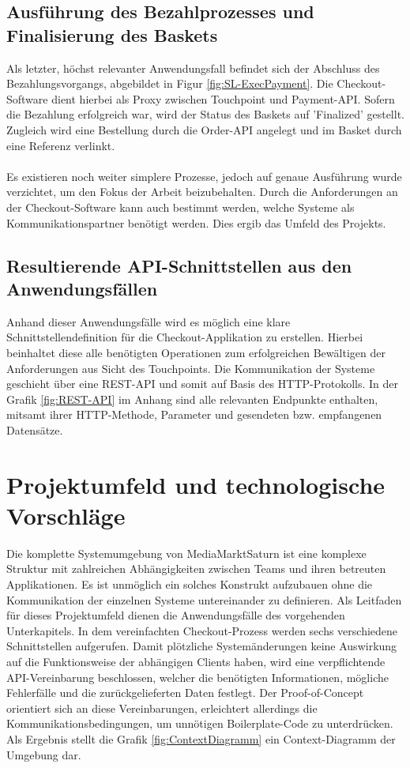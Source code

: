\subsection{Ausführung des Bezahlprozesses und Finalisierung des Baskets}

Als letzter, höchst relevanter Anwendungsfall befindet sich der Abschluss des Bezahlungsvorgangs, abgebildet in Figur \ref{fig:SL-ExecPayment}. Die Checkout-Software dient hierbei als Proxy zwischen Touchpoint und Payment-API. Sofern die Bezahlung erfolgreich war, wird der Status des Baskets auf 'Finalized' gestellt. Zugleich wird eine Bestellung durch die Order-API angelegt und im Basket durch eine Referenz verlinkt. \\\\

Es existieren noch weiter simplere Prozesse, jedoch auf genaue Ausführung wurde verzichtet, um den Fokus der Arbeit beizubehalten. Durch die Anforderungen an der Checkout-Software kann auch bestimmt werden, welche Systeme als Kommunikationspartner benötigt werden. Dies ergib das Umfeld des Projekts. 

\subsection{Resultierende API-Schnittstellen aus den Anwendungsfällen}

Anhand dieser Anwendungsfälle wird es möglich eine klare Schnittstellendefinition für die Checkout-Applikation zu erstellen. Hierbei beinhaltet diese alle benötigten Operationen zum erfolgreichen Bewältigen der Anforderungen aus Sicht des Touchpoints. Die Kommunikation der Systeme geschieht über eine \acrshort{REST}-API und somit auf Basis des \acrshort{HTTP}-Protokolls. In der Grafik \ref{fig:REST-API} im Anhang sind alle relevanten Endpunkte enthalten, mitsamt ihrer HTTP-Methode, Parameter und gesendeten bzw. empfangenen Datensätze.

\section{Projektumfeld und technologische Vorschläge}

Die komplette Systemumgebung von MediaMarktSaturn ist eine komplexe Struktur mit zahlreichen Abhängigkeiten zwischen Teams und ihren betreuten Applikationen. Es ist unmöglich ein solches Konstrukt aufzubauen ohne die Kommunikation der einzelnen Systeme untereinander zu definieren. Als Leitfaden für dieses Projektumfeld dienen die Anwendungsfälle des vorgehenden Unterkapitels. In dem vereinfachten Checkout-Prozess werden sechs verschiedene Schnittstellen aufgerufen. Damit plötzliche Systemänderungen keine Auswirkung auf die Funktionsweise der abhängigen Clients haben, wird eine verpflichtende API-Vereinbarung beschlossen, welcher die benötigten Informationen, mögliche Fehlerfälle und die zurückgelieferten Daten festlegt. Der Proof-of-Concept orientiert sich an diese Vereinbarungen, erleichtert allerdings die Kommunikationsbedingungen, um unnötigen \Gls{Boilerplate}-Code zu unterdrücken. Als Ergebnis stellt die Grafik \ref{fig:ContextDiagramm} ein Context-Diagramm der Umgebung dar.


